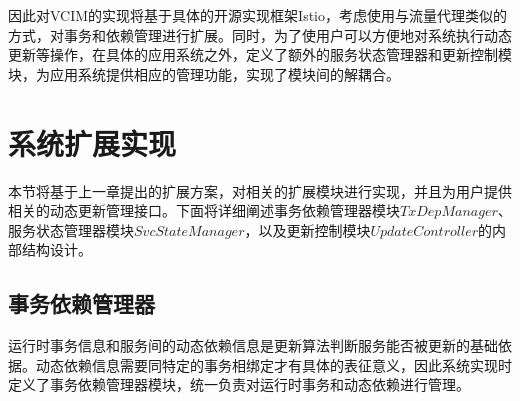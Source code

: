 \documentclass[macfonts,master]{njuthesis}
\begin{document}
因此对VCIM的实现将基于具体的开源实现框架Istio，考虑使用与流量代理类似的方式，对事务和依赖管理进行扩展。同时，为了使用户可以方便地对系统执行动态更新等操作，在具体的应用系统之外，定义了额外的服务状态管理器和更新控制模块，为应用系统提供相应的管理功能，实现了模块间的解耦合。













\section{系统扩展实现}
本节将基于上一章提出的扩展方案，对相关的扩展模块进行实现，并且为用户提供相关的动态更新管理接口。下面将详细阐述事务依赖管理器模块$TxDepManager$、服务状态管理器模块$SvcStateManager$，以及更新控制模块$UpdateController$的内部结构设计。

\subsection{事务依赖管理器}
运行时事务信息和服务间的动态依赖信息是更新算法判断服务能否被更新的基础依据。动态依赖信息需要同特定的事务相绑定才有具体的表征意义，因此系统实现时定义了事务依赖管理器模块，统一负责对运行时事务和动态依赖进行管理。
\end{document}

